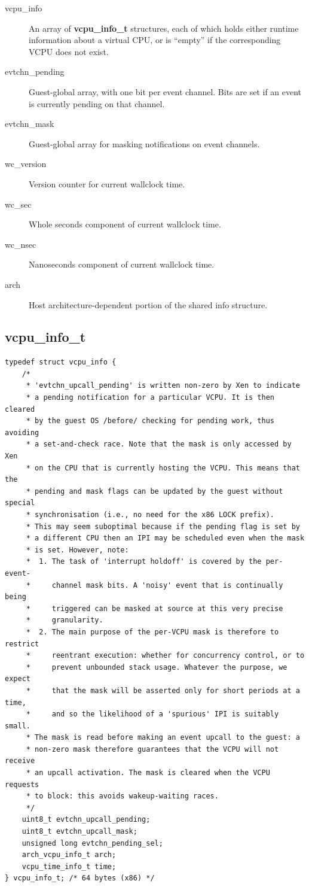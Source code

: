 \documentclass[11pt,twoside,final,openright,a4paper]{report}
\begin{document}
\begin{description}
\item[vcpu\_info] An array of {\bf vcpu\_info\_t} structures, each of
  which holds either runtime information about a virtual CPU, or is
  ``empty'' if the corresponding VCPU does not exist.
\item[evtchn\_pending] Guest-global array, with one bit per event
  channel.  Bits are set if an event is currently pending on that
  channel.
\item[evtchn\_mask] Guest-global array for masking notifications on
  event channels.
\item[wc\_version] Version counter for current wallclock time.
\item[wc\_sec] Whole seconds component of current wallclock time.
\item[wc\_nsec] Nanoseconds component of current wallclock time.
\item[arch] Host architecture-dependent portion of the shared info
  structure.
\end{description}

\subsection{vcpu\_info\_t}

\scriptsize
\begin{verbatim}
typedef struct vcpu_info {
    /*
     * 'evtchn_upcall_pending' is written non-zero by Xen to indicate
     * a pending notification for a particular VCPU. It is then cleared 
     * by the guest OS /before/ checking for pending work, thus avoiding
     * a set-and-check race. Note that the mask is only accessed by Xen
     * on the CPU that is currently hosting the VCPU. This means that the
     * pending and mask flags can be updated by the guest without special
     * synchronisation (i.e., no need for the x86 LOCK prefix).
     * This may seem suboptimal because if the pending flag is set by
     * a different CPU then an IPI may be scheduled even when the mask
     * is set. However, note:
     *  1. The task of 'interrupt holdoff' is covered by the per-event-
     *     channel mask bits. A 'noisy' event that is continually being
     *     triggered can be masked at source at this very precise
     *     granularity.
     *  2. The main purpose of the per-VCPU mask is therefore to restrict
     *     reentrant execution: whether for concurrency control, or to
     *     prevent unbounded stack usage. Whatever the purpose, we expect
     *     that the mask will be asserted only for short periods at a time,
     *     and so the likelihood of a 'spurious' IPI is suitably small.
     * The mask is read before making an event upcall to the guest: a
     * non-zero mask therefore guarantees that the VCPU will not receive
     * an upcall activation. The mask is cleared when the VCPU requests
     * to block: this avoids wakeup-waiting races.
     */
    uint8_t evtchn_upcall_pending;
    uint8_t evtchn_upcall_mask;
    unsigned long evtchn_pending_sel;
    arch_vcpu_info_t arch;
    vcpu_time_info_t time;
} vcpu_info_t; /* 64 bytes (x86) */
\end{verbatim}
\normalsize
\end{document}
